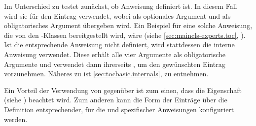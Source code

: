 Im Unterschied zu  testet 
zunächst, ob Anweisung 
definiert ist. In diesem Fall wird sie für den Eintrag verwendet, wobei
 als optionales Argument und  als
obligatorisches Argument übergeben wird. Ein Beispiel für eine solche
Anweisung, die von den \KOMAScript-Klassen bereitgestellt wird, wäre
 (siehe
\autoref{sec:maincls-experts.toc},
). Ist die entsprechende
Anweisung nicht definiert, wird stattdessen die interne Anweisung
 verwendet. Diese erhält
alle vier Argumente als obligatorische Argumente und verwendet dann
ihrerseits , um den gewünschten Eintrag
vorzunehmen. Näheres zu  ist
\autoref{sec:tocbasic.internals},
 zu entnehmen.

Ein Vorteil der Verwendung von  gegenüber
 ist zum einen, dass die Eigenschaft
 (siehe ) beachtet
wird. Zum anderen kann die Form der Einträge über die Definition
entsprechender, für die  und 
spezifischer Anweisungen konfiguriert werden.%
%
\EndIndexGroup


